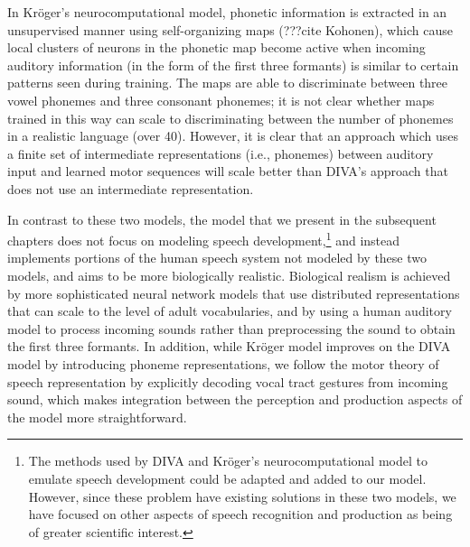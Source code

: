 In Kr\"{o}ger's neurocomputational model,
phonetic information is extracted
in an unsupervised manner
using self-organizing maps
(???cite Kohonen),
which cause
local clusters of neurons
in the phonetic map become active
when incoming auditory information
(in the form of the first three formants)
is similar to certain patterns
seen during training.
The maps are able to
discriminate between three vowel phonemes
and three consonant phonemes;
it is not clear whether
maps trained in this way
can scale to discriminating
between the number of phonemes
in a realistic language (over 40).
However, it is clear that an approach
which uses a finite set of intermediate representations
(i.e., phonemes)
between auditory input
and learned motor sequences
will scale better than DIVA's approach
that does not use an intermediate representation.

In contrast to these two models,
the model that we present
in the subsequent chapters does not focus on
modeling speech development,\footnote{
  The methods used by DIVA and Kr\"{o}ger's
  neurocomputational model to emulate
  speech development could be adapted
  and added to our model.
  However, since these problem have existing
  solutions in these two models,
  we have focused on other aspects
  of speech recognition and production
  as being of greater scientific interest.}
and instead implements
portions of the human speech system
not modeled by these two models,
and aims to be more biologically realistic.
Biological realism is achieved
by more sophisticated neural network models
that use distributed representations
that can scale to the level
of adult vocabularies,
and by using a human auditory model
to process incoming sounds
rather than preprocessing the sound
to obtain the first three formants.
In addition, while Kr\"{o}ger model
improves on the DIVA model by
introducing phoneme representations,
we follow the motor theory
of speech representation by
explicitly decoding vocal tract gestures
from incoming sound,
which makes integration between
the perception and production aspects
of the model more straightforward.
